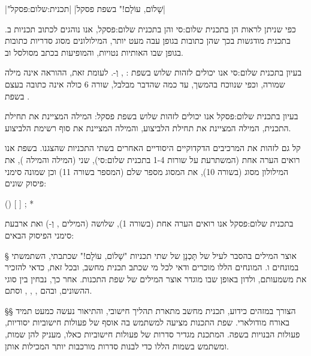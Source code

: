\begin{תכנית}
\setLTR

\setRTL
{}|"שָׁלוֹם, עוֹלָם!" בשפת פסקל|
|תכנית:שלום:פסקל|
\end{תכנית}
כפי שניתן לראות הן ב תכנית שלום:סי והן ב תכנית שלום:פסקל, אנו נוהגים
לכתוב תכניות ב.  בתכנית
מודגשות בכך שהן כתובות בגופן עבה מעט יותר, המילולונים מסוג סדריות כתובות בגופן
שבו האותיות נטויות, וה מופיעות בכתב מסולסל וב.

בעיון ב תכנית שלום:סי אנו יכולים לזהות שלוש 
בשפת : ,  וְ-. 
לעומת זאת, ההוראה 
אינה מילה שמורה, וכפי שנווכח בהמשך, עד כמה שהדבר מבלבל, שורה 6 כולה אינה כתובה
בעצם בשפת .

בעיון ב תכנית שלום:פסקל אנו יכולים לזהות שלוש  בשפת פסקל: המילה  המציינת את תחילת התכנית, המילה
 המציינת את תחילת ה לביצוע, והמילה  המציינת את סוף
רשימת ה לביצוע.

קל גם לזהות את המרכיבים הדקדוקיים היסודיים האחרים בשתי התכניות שהצגנו. בשפת
 אנו רואים הערה אחת (המשתרעת על שורות 1-4 ב תכנית שלום:סי), שני 
(המילה  והמילה ), את המילולון מסוג  (בשורה 10), את
ה מסוג מספר שלם (המספר  בשורה 11) וכן שמונה סימני פיסוק שונים:

\begin{english}
\let\ttfamily=\listingsfont
\begin{CPP}
  () { } [ ] ; *
\end{CPP}
\end{english}

ב תכנית שלום:פסקל אנו רואים הערה אחת (בשורה 1), שלושה  (המילים
,  וְ-) ואת ארבעת סימני הפיסוק הבאים:


§ אוצר המילים
בהסבר לעיל של תָּכְנָן של שתי תכניות "שָׁלוֹם, עוֹלָם!" שכתבתי, השתמשתי במונחים
 ו. המונחים הללו מוכרים
ודאי לכל מי שכתב תכנית מחשב,
ובכל זאת, כדאי להזכיר את משמעותם, ולדון באופן שבו מוגדר אוצר המילים של שפת
התכנות. אחר כך, נבחין בין סוגי ה השונים, ובהם
,
, , ו סתם.

§§ הצורך במזהים
כידוע, תכנית מחשב מתארת תהליך חישובי, והתיאור נעשה כמעט תמיד באורח מודולארי.
שפת התכנות מציעה למשתמש בה אוסף של פעולות חישוביות יסודיות, פעולות הבנויות
בשפה. המתכנת מגדיר סדרות של פעולות חישוביות כאלו, מעניק להן שמות, ומשתמש
בשמות הללו כדי לבנות סדרות מורכבות יותר המכילות אותן.

